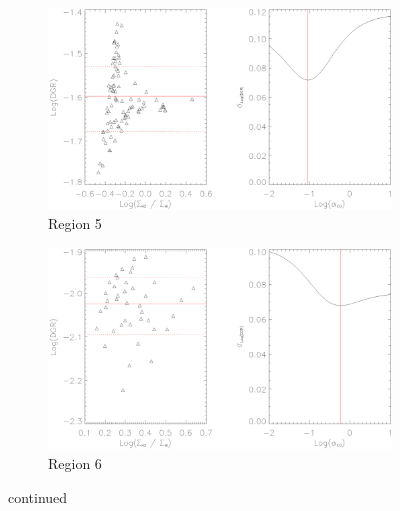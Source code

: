 \begin{figure}
  \ContinuedFloat
  \begin{subfigure}[t]{1\textwidth}
    \centering
    \includegraphics[width=1.\textwidth]{dgr_imgs/region_5_aco_output_10.eps}
    \caption{Region 5}
  \end{subfigure}

  \begin{subfigure}[t]{1\textwidth}
    \centering
    \includegraphics[width=1.\textwidth]{dgr_imgs/region_6_aco_output_10.eps}
    \caption{Region 6}
  \end{subfigure}
   \caption{continued}
   \label{fig:dgr_co10}
\end{figure}

